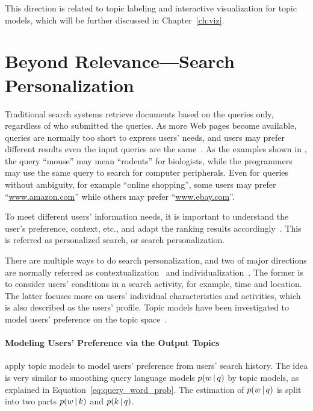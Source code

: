 This direction is related to topic labeling and
interactive visualization for topic models, which will be further
discussed in Chapter~\ref{ch:viz}.

\section{Beyond Relevance---Search Personalization}

Traditional search systems retrieve documents based on the queries
only, regardless of who submitted the queries.  As more Web pages
become available, queries are normally too short to express users'
needs, and users may prefer different results even the input queries
are the same~\citep{Jansen-2000,Dou-2007}.  As the examples shown in
\citet{Dou-2007}, the query ``mouse'' may mean ``rodents'' for
biologists, while the programmers may use the same query to search for
computer peripherals. Even for queries without ambiguity, for example
``online shopping'', some users may prefer ``\url{www.amazon.com}''
while others may prefer ``\url{www.ebay.com}''.

To meet different users' information needs, it is important to
understand the user's preference, context, etc., and adapt the ranking
results accordingly~\citep{Pitkow-2002,Micarelli-2007}.  This is
referred as personalized search, or search personalization.

There are multiple ways to do search personalization, and two of major
directions are normally referred as
contextualization~\citep{Melucci-2012} and
individualization~\citep{Pitkow-2002}. The former is to consider
users' conditions in a search activity, for example, time and
location.  The latter focuses more on users' individual
characteristics and activities, which is also described as the users'
profile.  Topic models have been investigated to model users'
preference on the topic space~\citep{Song-2010,Carman-2010}.

\paragraph{Modeling Users' Preference via the Output Topics}

\citet{Song-2010} apply topic models to model users' preference from
users' search history. The idea is very similar to smoothing query
language models $p(w \, | \, q)$ by topic models, as explained in
Equation~\ref{eq:query_word_prob}. The estimation of $p(w \, | \, q)$ is
split into two parts $p(w \, | \, k)$ and $p(k \, | \, q)$.

